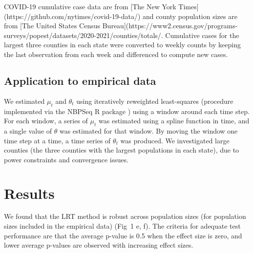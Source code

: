 \documentclass[10pt,letterpaper]{article}
\begin{document}
COVID-19 cumulative case data are from [The New York Times](https://github.com/nytimes/covid-19-data/) and county population sizes are from [The United States Census Bureau](https://www2.census.gov/programs-surveys/popest/datasets/2020-2021/counties/totals/. Cumulative cases for the largest three counties in each state were converted to weekly counts by keeping the last observation from each week and differenced to compute new cases.

\subsection*{Application to empirical data}

We estimated \begin{math}\mu_t\end{math} and \begin{math}\theta_t\end{math} using iteratively reweighted least-squares (procedure implemented via the NBPSeq R package \cite{NBPSeq}) using a window around each time step.
For each window, a series of \begin{math}\mu_t\end{math} was estimated using a spline function in time, and a single value of \begin{math}\theta\end{math} was estimated for that window. 
By moving the window one time step at a time, a time series of \begin{math}\theta_t\end{math} was produced. We investigated large counties (the three counties with the largest populations in each state), due to power constraints and convergence issues.

\section*{Results}
We found that the LRT method is robust across population sizes (for population sizes included in the empirical data) (Fig\ 1 e, f).
The criteria for adequate test performance are that the average p-value is 0.5 when the effect size is zero, and lower average p-values are observed with increasing effect sizes. 
\end{document}
